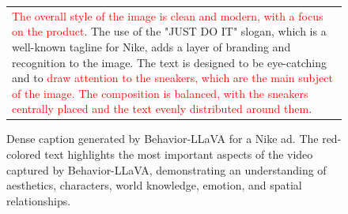 \begin{figure}[t]
\begin{minipage}[c]{0.72\textwidth}
\begin{tabular}{p{8.5cm}}
\textcolor{red}{The overall style of the image is clean and modern, with a focus on the product}. The use of the "JUST DO IT" slogan, which is a well-known tagline for Nike, adds a layer of branding and recognition to the image. The text is designed to be eye-catching and to \textcolor{red}{draw attention to the sneakers, which are the main subject of the image. The composition is balanced, with the sneakers centrally placed and the text evenly distributed around them}.
\end{tabular}
\end{minipage}
\caption{Dense caption generated by Behavior-LLaVA for a Nike ad. The red-colored text highlights the most important aspects of the video captured by Behavior-LLaVA, demonstrating an understanding of aesthetics, characters, world knowledge, emotion, and spatial relationships.}
\label{fig:qualitative-image-2}
\end{figure}







